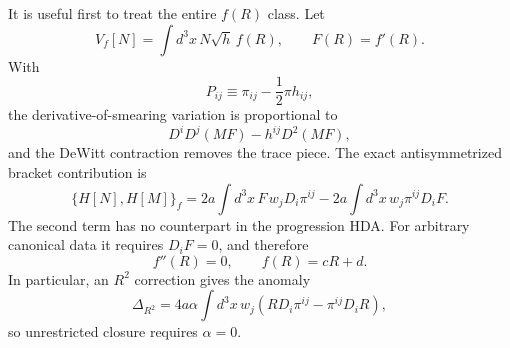 \documentclass[11pt]{article}
\begin{document}
It is useful first to treat the entire $f(R)$ class. Let
\begin{equation}
    V_f[N]=\int d^3x\,N\sqrt h\,f(R),
    \qquad F(R)=f'(R).
\end{equation}
With
\begin{equation}
    P_{ij}\equiv\pi_{ij}-\frac12\pi h_{ij},
\end{equation}
the derivative-of-smearing variation is proportional to
\begin{equation}
    D^iD^j(MF)-h^{ij}D^2(MF),
\end{equation}
and the DeWitt contraction removes the trace piece. The exact antisymmetrized bracket contribution is
\begin{equation}
\boxed{
\{H[N],H[M]\}_{f}
=2a\int d^3x\,
F\,w_jD_i\pi^{ij}
-2a\int d^3x\,
w_j\pi^{ij}D_iF.}
\label{eq:fR_bracket}
\end{equation}
The second term has no counterpart in the progression HDA. For arbitrary canonical data it requires $D_iF=0$, and therefore
\begin{equation}
    \boxed{f''(R)=0,\qquad f(R)=cR+d.}
    \label{eq:fR_linear}
\end{equation}
In particular, an $R^2$ correction gives the anomaly
\begin{equation}
\boxed{
\Delta_{R^2}
=4a\alpha\int d^3x\,w_j
\left(RD_i\pi^{ij}-\pi^{ij}D_iR\right),}
\label{eq:R2_anomaly}
\end{equation}
so unrestricted closure requires $\alpha=0$.
\end{document}
